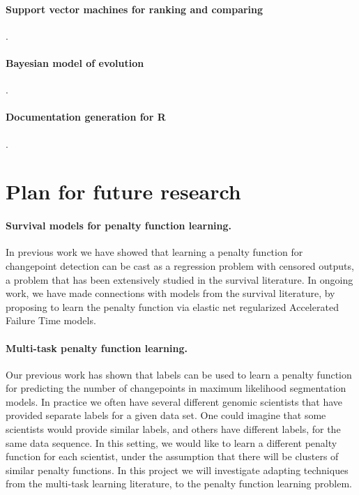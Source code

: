\documentclass{article}
\begin{document}
\paragraph{Support vector machines for ranking and comparing}\citep{svmcompare}.

\paragraph{Bayesian model of evolution} \citep{HOCKING-evolution}.

\paragraph{Documentation generation for R} \citep{hocking13:inlinedocs}.

\section{Plan for future research}

\paragraph{Survival models for penalty function learning.} In previous
work we have showed that learning a penalty function for changepoint
detection can be cast as a regression problem with censored outputs, a
problem that has been extensively studied in the survival
literature. In ongoing work, we have made connections with models from
the survival literature, by proposing to learn the penalty function
via elastic net regularized Accelerated Failure Time models.

\paragraph{Multi-task penalty function learning.} Our previous work
has shown that labels can be used to learn a penalty function for
predicting the number of changepoints in maximum likelihood
segmentation models. In practice we often have several different
genomic scientists that have provided separate labels for a given data
set. One could imagine that some scientists would provide similar
labels, and others have different labels, for the same data
sequence. In this setting, we would like to learn a different penalty
function for each scientist, under the assumption that there will be
clusters of similar penalty functions. In this project we will
investigate adapting techniques from the multi-task learning
literature, to the penalty function learning problem.
\end{document}
